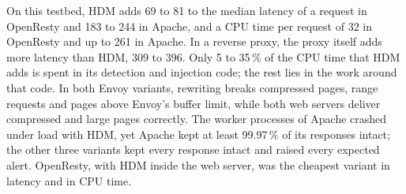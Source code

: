 \documentclass{rptuma}
\begin{document}
On this testbed, HDM adds 69 to 81\us{} to the median latency of a request in OpenResty and 183
to 244\us{} in Apache, and a CPU time per request of 32\us{} in OpenResty and up to 261\us{} in Apache.
In a reverse proxy, the proxy itself adds more latency than HDM, 309 to 396\us. Only 5 to 35\,\% of
the CPU time that HDM adds is spent in its detection and injection code; the rest lies in the work
around that code. In both Envoy variants, rewriting breaks compressed pages, range requests and
pages above Envoy's buffer limit, while both web servers deliver compressed and large pages
correctly. The worker processes of Apache crashed under load with HDM, yet Apache kept at least
99.97\,\% of its responses intact; the other three variants kept every response intact and raised
every expected alert. OpenResty, with HDM inside the web server, was the cheapest variant in latency
and in CPU time.
\end{document}
